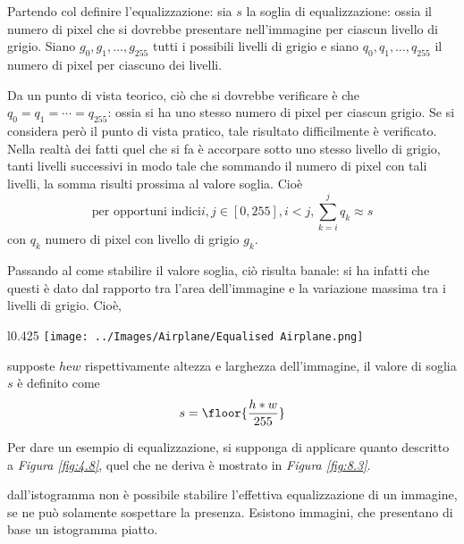 \documentclass{subfiles}
\begin{document}
Partendo col definire l'equalizzazione: sia \(s\) la soglia di equalizzazione: ossia il numero di pixel che si dovrebbe presentare nell'immagine per ciascun livello di grigio.
Siano \(g_{0}, g_{1}, \ldots, g_{255}\) tutti i possibili livelli di grigio e siano \(q_{0}, q_{1}, \ldots, q_{255}\) il numero di pixel per ciascuno dei livelli.

Da un punto di vista teorico, ciò che si dovrebbe verificare è che \(q_{0} = q_{1} = \cdots = q_{255}\): ossia si ha uno stesso numero di pixel per ciascun grigio.
Se si considera però il punto di vista pratico, tale risultato difficilmente è verificato.
Nella realtà dei fatti quel che si fa è accorpare sotto uno stesso livello di grigio, tanti livelli successivi in modo tale che sommando il numero di pixel con tali livelli,
la somma risulti prossima al valore soglia. Cioè
\[
    \text{per opportuni indici} i,j \in [0, 255], i < j, \sum\limits_{k = i}^{j}{q_{k}} \approx s
\]
con \(q_{k}\) numero di pixel con livello di grigio \(g_{k}\).

Passando al come stabilire il valore soglia, ciò risulta banale: si ha infatti che questi è dato dal rapporto tra l'area dell'immagine e la variazione massima tra i livelli di grigio.
Cioè,
\begin{wrapfigure}{l}{0.425\textwidth}
    \centering
    \texttt{[image: ../Images/Airplane/Equalised Airplane.png]}
    \caption{Equalizzazione di \emph{Figura \ref{fig:4.8}}.}
    \label{fig:8.3}
\end{wrapfigure}
supposte \(h \text{e} w\) rispettivamente altezza e larghezza dell'immagine, il valore di soglia \(s\) è definito come
\[
    s = \floor{\frac{h * w}{255}}
\]

Per dare un esempio di equalizzazione, si supponga di applicare quanto descritto a \emph{Figura \ref{fig:4.8}}, quel che ne deriva è mostrato in \emph{Figura \ref{fig:8.3}}.
\begin{Note*}
    dall'istogramma non è possibile stabilire l'effettiva equalizzazione di un immagine, se ne può solamente sospettare la presenza. Esistono immagini,
    che presentano di base un istogramma piatto.
\end{Note*}

\clearpage
\end{document}
